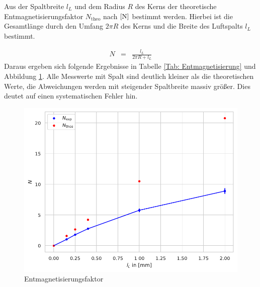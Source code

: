 \documentclass[12pt,a4paper]{scrartcl}
\numberwithin{equation}{section} %
\renewcommand{\[}{} %
\renewcommand{\]}{\noindent} %
\begin{document}
Aus der Spaltbreite \(l_L\) und dem Radius \(R\) des Kerns der theoretische Entmagnetisierungsfaktor \(N_\mathrm{theo}\) nach \(\eqref{N}\) bestimmt werden. Hierbei ist die Gesamtlänge durch den Umfang \(2\pi R\) des Kerns und die Breite des Luftspalts \(l_L\)
bestimmt.

\begin{eqnarray}
    N &=& \frac{l_L}{2\pi R + l_L} 
\end{eqnarray}
Daraus ergeben sich folgende Ergebnisse in Tabelle \ref{Tab: Entmagnetisierung} und Abbildung \ref{Abb: Entmagnetisierung}. Alle Messwerte mit Spalt sind deutlich kleiner als die theoretischen Werte, die Abweichungen werden mit steigender Spaltbreite massiv größer. Dies deutet auf einen systematischen Fehler hin.

\begin{figure}
	\centering
	\includegraphics[scale=0.6]{../media/B2.4/3.3.4_N.pdf}
	\caption{Entmagnetisierungsfaktor}
	\label{Abb: Entmagnetisierung}
\end{figure}
\end{document}
